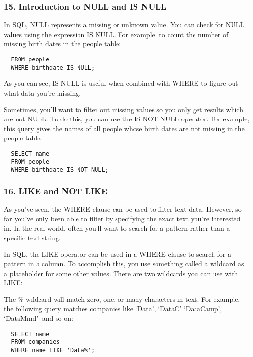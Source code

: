 \documentclass[
]{article}
\begin{document}
\hypertarget{introduction-to-null-and-is-null}{%
\subsubsection{15. Introduction to NULL and IS
NULL}\label{introduction-to-null-and-is-null}}

In SQL, NULL represents a missing or unknown value. You can check for
NULL values using the expression IS NULL. For example, to count the
number of missing birth dates in the people table:

\begin{verbatim}
  FROM people
  WHERE birthdate IS NULL;
\end{verbatim}

As you can see, IS NULL is useful when combined with WHERE to figure out
what data you're missing.

Sometimes, you'll want to filter out missing values so you only get
results which are not NULL. To do this, you can use the IS NOT NULL
operator. For example, this query gives the names of all people whose
birth dates are not missing in the people table.

\begin{verbatim}
  SELECT name
  FROM people
  WHERE birthdate IS NOT NULL;
\end{verbatim}

\hypertarget{like-and-not-like}{%
\subsubsection{16. LIKE and NOT LIKE}\label{like-and-not-like}}

As you've seen, the WHERE clause can be used to filter text data.
However, so far you've only been able to filter by specifying the exact
text you're interested in. In the real world, often you'll want to
search for a pattern rather than a specific text string.

In SQL, the LIKE operator can be used in a WHERE clause to search for a
pattern in a column. To accomplish this, you use something called a
wildcard as a placeholder for some other values. There are two wildcards
you can use with LIKE:

The \% wildcard will match zero, one, or many characters in text. For
example, the following query matches companies like `Data', `DataC'
`DataCamp', `DataMind', and so on:

\begin{verbatim}
  SELECT name
  FROM companies
  WHERE name LIKE 'Data%';
\end{verbatim}
\end{document}
